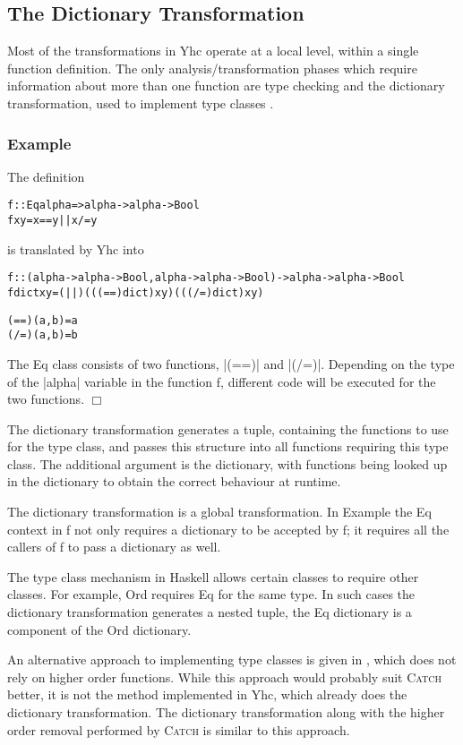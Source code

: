 \documentclass[preprint]{sigplanconf}
\let\cite=\citep
\newcommand{\C}[1]{\textsf{#1}}
\newcommand{\catch}{\textsc{Catch}}
\newcounter{exmp}
\newcommand{\yesexample}{\subsubsection*{Example \arabic{exmp}}\addtocounter{exmp}{1}}
\newcommand{\noexample}{\hfill$\Box$}
\newcommand{\lastexample}{\arabic{exmp}}
\newenvironment{code}{\begin{alltt}\small}{\end{alltt}}
\newenvironment{example}{\yesexample}{\noexample}
\begin{document}
\subsection{The Dictionary Transformation}
\label{sec:dict}

Most of the transformations in Yhc operate at a local level, within a single function definition. The only analysis/transformation phases which require information about more than one function are type checking and the dictionary transformation, used to implement type classes \citep{wadler:type_classes}.

\begin{example}
The definition

\begin{code}
f :: Eq alpha => alpha -> alpha -> Bool
f x y = x == y || x /= y
\end{code}

\noindent is translated by Yhc into

\begin{code}
f :: (alpha -> alpha -> Bool, alpha -> alpha -> Bool) -> alpha -> alpha -> Bool
f dict x y = (||) (((==) dict) x y) (((/=) dict) x y)

(==) (a,b) = a
(/=) (a,b) = b
\end{code}

The \C{Eq} class consists of two functions, |(==)| and |(/=)|. Depending on the type of the |alpha| variable in the function \C{f}, different code will be executed for the two functions.
\end{example}

The dictionary transformation generates a tuple, containing the functions to use for the type class, and passes this structure into all functions requiring this type class. The additional argument is the dictionary, with functions being looked up in the dictionary to obtain the correct behaviour at runtime.

The dictionary transformation is a global transformation. In Example \lastexample{} the \C{Eq} context in \C{f} not only requires a dictionary to be accepted by \C{f}; it requires all the callers of \C{f} to pass a dictionary as well.

The type class mechanism in Haskell allows certain classes to require other classes. For example, \C{Ord} requires \C{Eq} for the same type. In such cases the dictionary transformation generates a nested tuple, the \C{Eq} dictionary is a component of the \C{Ord} dictionary.

An alternative approach to implementing type classes is given in \cite{jones:dictionary_free}, which does not rely on higher order functions. While this approach would probably suit \catch{} better, it is not the method implemented in Yhc, which already does the dictionary transformation. The dictionary transformation along with the higher order removal performed by \catch{} is similar to this approach.
\end{document}
